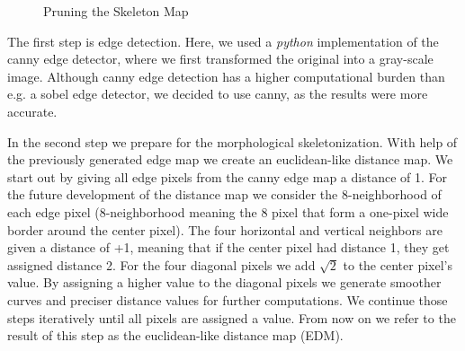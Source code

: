 \documentclass[10pt,conference,compsocconf]{IEEEtran}
\begin{document}
\begin{figure}[tp]
	\centering
	\hspace{0.025\linewidth}
	\hspace{0.025\linewidth}
	\caption{Pruning the Skeleton Map}
\end{figure}

The first step is edge detection. Here, we used a \emph{python} implementation of the canny edge detector, where we first transformed the original into a gray-scale image. Although canny edge detection has a higher computational burden than e.g. a sobel edge detector, we decided to use canny, as the results were more accurate.

In the second step we prepare for the morphological skeletonization. With help of the previously generated edge map we create an euclidean-like distance map. We start out by giving all edge pixels from the canny edge map a distance of 1. For the future development of the distance map we consider the 8-neighborhood of each edge pixel (8-neighborhood meaning the 8 pixel that form a one-pixel wide border around the center pixel). The four horizontal and vertical neighbors are given a distance of +1, meaning that if the center pixel had distance 1, they get assigned distance 2. For the four diagonal pixels we add $\sqrt{2}$ to the center pixel's value. By assigning a higher value to the diagonal pixels we generate smoother curves and preciser distance values for further computations. We continue those steps iteratively until all pixels are assigned a value. From now on we refer to the result of this step as the euclidean-like distance map (EDM).
\end{document}

